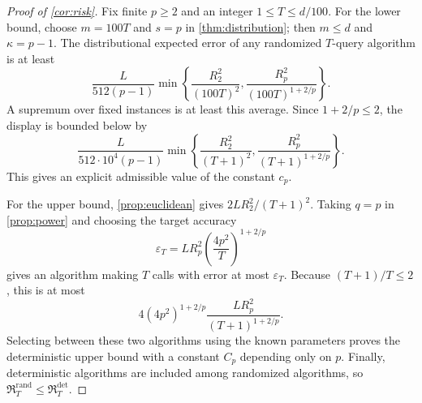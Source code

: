\documentclass[11pt]{article}
\newcommand{\Risk}{\mathfrak{R}}
\newcommand{\eps}{\varepsilon}
\theoremstyle{definition}
\theoremstyle{remark}
\begin{document}
\begin{proof}[Proof of \cref{cor:risk}]
Fix finite $p\ge2$ and an integer $1\le T\le d/100$.
For the lower bound, choose $m=100T$ and $s=p$ in
\cref{thm:distribution}; then $m\le d$ and $\kappa=p-1$.
The distributional expected error of any randomized $T$-query
algorithm is at least
\[
 \frac{L}{512(p-1)}
 \min\left\{
  \frac{R_2^2}{(100T)^2},
  \frac{R_p^2}{(100T)^{1+2/p}}
 \right\}.
\]
A supremum over fixed instances is at least this average.
Since $1+2/p\le2$, the display is bounded below by
\[
 \frac{L}{512\cdot10^4(p-1)}
 \min\left\{
  \frac{R_2^2}{(T+1)^2},
  \frac{R_p^2}{(T+1)^{1+2/p}}
 \right\}.
\]
This gives an explicit admissible value of the constant $c_p$.

For the upper bound, \cref{prop:euclidean} gives
$2LR_2^2/(T+1)^2$.
Taking $q=p$ in \cref{prop:power} and choosing the target accuracy
\[
 \eps_T=LR_p^2\left(\frac{4p^2}{T}\right)^{1+2/p}
\]
gives an algorithm making $T$ calls with error at most $\eps_T$.
Because $(T+1)/T\le2$, this is at most
\[
 4(4p^2)^{1+2/p}\frac{LR_p^2}{(T+1)^{1+2/p}}.
\]
Selecting between these two algorithms using the known parameters
proves the deterministic upper bound with a constant $C_p$ depending
only on $p$.  Finally, deterministic algorithms are included among
randomized algorithms, so
$\Risk_T^{\mathrm{rand}}\le\Risk_T^{\mathrm{det}}$.
\end{proof}
\end{document}
